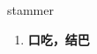 
\begin{frame}
{\huge stammer}
\begin{center}
\begin{enumerate}\Large
  \item \textbf{口吃，结巴}
\end{enumerate}
\end{center}
\end{frame}
